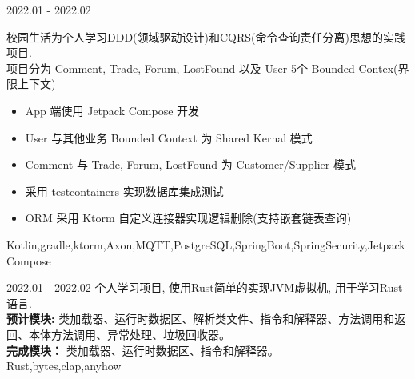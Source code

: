 \documentclass[zh]{resume}
\begin{document}
\begin{projects}
\end{projects}

\begin{projects}
	\project
  {\color{accentcolor}{alumnihub}}{2022.01 - 2022.02}
  {
    校园生活为个人学习DDD(领域驱动设计)和CQRS(命令查询责任分离)思想的实践项目. \\
    项目分为 Comment, Trade, Forum, LostFound 以及 User 5个 Bounded Contex(界限上下文)
    \begin{itemize}
      \item App 端使用 Jetpack Compose 开发
      \item User 与其他业务 Bounded Context 为 Shared Kernal 模式
      \item Comment 与 Trade, Forum, LostFound 为 Customer/Supplier 模式
      \item 采用 testcontainers 实现数据库集成测试
      \item ORM 采用 Ktorm 自定义连接器实现逻辑删除(支持嵌套链表查询)
    \end{itemize}
  }
  {Kotlin,gradle,ktorm,Axon,MQTT,PostgreSQL,SpringBoot,SpringSecurity,Jetpack Compose}

	\project
  {\color{accentcolor}{jvmrs}}{2022.01 - 2022.02}
  {
    个人学习项目, 使用Rust简单的实现JVM虚拟机, 用于学习Rust语言. \\
    {\textbf{预计模块: } 类加载器、运行时数据区、解析类文件、指令和解释器、方法调用和返回、本体方法调用、异常处理、垃圾回收器。} \\
    {\textbf{完成模块：} 类加载器、运行时数据区、指令和解释器。} \\
  }
  {Rust,bytes,clap,anyhow}

\end{projects}
\end{document}
